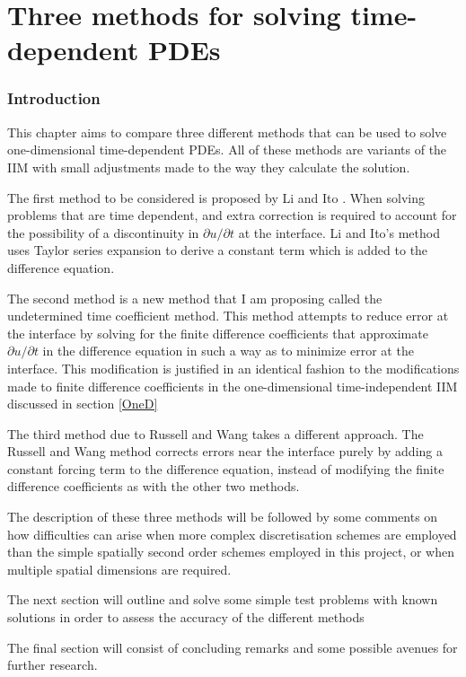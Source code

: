 \part{Three methods for solving time-dependent PDEs}
\section{Introduction}
This chapter aims to compare three different methods that can be used to solve one-dimensional time-dependent PDEs.
All of these methods are variants of the IIM with small adjustments made to the way they calculate the solution.

The first method to be considered is proposed by Li and Ito \cite{liito06}.
When solving problems that are time dependent, and extra correction is required to account for the possibility of a discontinuity in $\partial u / \partial t$ at the interface.
Li and Ito's method uses Taylor series expansion to derive a constant term which is added to the difference equation.

The second method is a new method that I am proposing called the undetermined time coefficient method.
This method attempts to reduce error at the interface by solving for the finite difference coefficients that approximate $\partial u / \partial t$ in the difference equation in such a way as to minimize error at the interface.
This modification is justified in an identical fashion to the modifications made to finite difference coefficients in the one-dimensional time-independent IIM discussed in section \ref{OneD}

The third method due to Russell and Wang \cite{russellwang03} takes a different approach.
The Russell and Wang method corrects errors near the interface purely by adding a constant forcing term to the difference equation, instead of modifying the finite difference coefficients as with the other two methods.

The description of these three methods will be followed by some comments on how difficulties can arise when more complex discretisation schemes are employed than the simple spatially second order schemes employed in this project, or when multiple spatial dimensions are required.

The next section will outline and solve some simple test problems with known solutions in order to assess the accuracy of the different methods

The final section will consist of concluding remarks and some possible avenues for further research.
